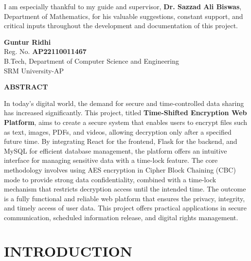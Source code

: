 \documentclass[12pt]{article}
\begin{document}
I am especially thankful to my guide and supervisor, \textbf{Dr. Sazzad Ali Biswas}, Department of Mathematics, for his valuable suggestions, constant support, and critical inputs throughout the development and documentation of this project.

\vspace{1cm}

\noindent
\textbf{Guntur Ridhi}\\
Reg. No. \textbf{AP22110011467}\\
B.Tech, Department of Computer Science and Engineering\\
SRM University-AP

\clearpage
\begin{center}
    \Large \textbf{ABSTRACT}
\end{center}
\vspace{1cm}

In today's digital world, the demand for secure and time-controlled data sharing has increased significantly. This project, titled \textbf{Time-Shifted Encryption Web Platform}, aims to create a secure system that enables users to encrypt files such as text, images, PDFs, and videos, allowing decryption only after a specified future time.
\vspace{1cm}
By integrating React for the frontend, Flask for the backend, and MySQL for efficient database management, the platform offers an intuitive interface for managing sensitive data with a time-lock feature.
\vspace{1cm}
The core methodology involves using AES encryption in Cipher Block Chaining (CBC) mode to provide strong data confidentiality, combined with a time-lock mechanism that restricts decryption access until the intended time. The outcome is a fully functional and reliable web platform that ensures the privacy, integrity, and timely access of user data. This project offers practical applications in secure communication, scheduled information release, and digital rights management.

\clearpage
\tableofcontents
\clearpage
{}
\setcounter{page}{1}


\section{INTRODUCTION}
\end{document}
